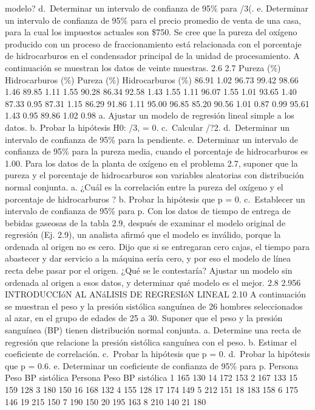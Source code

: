 \documentclass[
]{article}
\begin{document}
modelo? d.~Determinar un intervalo de confianza de 95\% para /3(. e.
Determinar un intervalo de confianza de 95\% para el precio promedio de
venta de una casa, para la cual los impuestos actuales son \$750. Se
cree que la pureza del oxígeno producido con un proceso de
fraccionamiento está relacionada con el porcentaje de hidrocarburos en
el condensador principal de la unidad de procesamiento. A continuación
se muestran los datos de veinte muestras. 2.6 2.7 Pureza (\%)
Hidrocarburos (\%) Pureza (\%) Hidrocarburos (\%) 86.91 1.02 96.73 99.42
98.66 1.46 89.85 1.11 1.55 90.28 86.34 92.58 1.43 1.55 1.11 96.07 1.55
1.01 93.65 1.40 87.33 0.95 87.31 1.15 86.29 91.86 1.11 95.00 96.85 85.20
90.56 1.01 0.87 0.99 95.61 1.43 0.95 89.86 1.02 0.98 a. Ajustar un
modelo de regresión lineal simple a los datos. b. Probar la hipótesis
H0: /3, = 0. c.~Calcular /?2. d.~Determinar un intervalo de confianza de
95\% para la pendiente. e. Determinar un intervalo de confianza de 95\%
para la pureza media, cuando el porcentaje de hidrocarburos es 1.00.
Para los datos de la planta de oxígeno en el problema 2.7, suponer que
la pureza y el porcentaje de hidrocarburos son variables aleatorias con
distribución normal conjunta. a. ¿Cuál es la correlación entre la pureza
del oxígeno y el porcentaje de hidrocarburos ? b. Probar la hipótesis
que p = 0. c.~Establecer un intervalo de confianza de 95\% para p. Con
los datos de tiempo de entrega de bebidas gaseosas de la tabla 2.9,
después de examinar el modelo original de regresión (Ej. 2.9), un
analista afirmó que el modelo es inválido, porque la ordenada al origen
no es cero. Dijo que si se entregaran cero cajas, el tiempo para
abastecer y dar servicio a la máquina sería cero, y por eso el modelo de
línea recta debe pasar por el origen. ¿Qué se le contestaría? Ajustar un
modelo sin ordenada al origen a esos datos, y determinar qué modelo es
el mejor. 2.8 2.956 INTRODUCCIóN AL ANáLISIS DE REGRESIóN LINEAL 2.10 A
continuación se muestran el peso y la presión sistólica sanguínea de 26
hombres seleccionados al azar, en el grupo de edades de 25 a 30. Suponer
que el peso y la presión sanguínea (BP) tienen distribución normal
conjunta. a. Determine una recta de regresión que relacione la presión
sistólica sanguínea con el peso. b. Estimar el coeficiente de
correlación. c.~Probar la hipótesis que p = 0. d.~Probar la hipótesis
que p = 0.6. e. Determinar un coeficiente de confianza de 95\% para p.
Persona Peso BP sistólica Persona Peso BP sistólica 1 165 130 14 172 153
2 167 133 15 159 128 3 180 150 16 168 132 4 155 128 17 174 149 5 212 151
18 183 158 6 175 146 19 215 150 7 190 150 20 195 163 8 210 140 21 180
\end{document}
